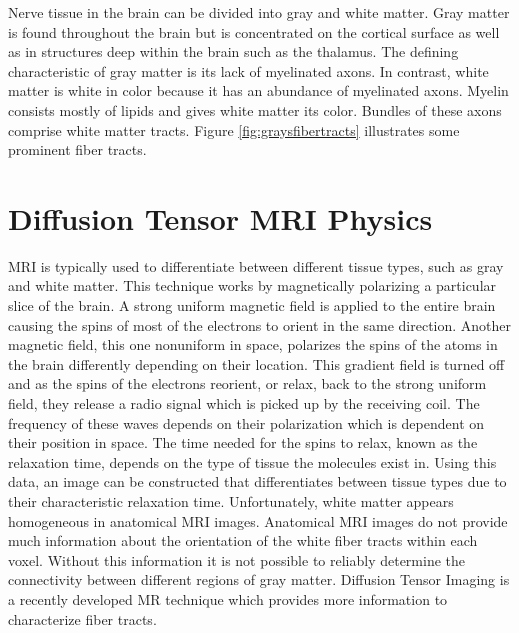 Nerve tissue in the brain can be divided into gray and white matter.  Gray matter is found throughout the brain but is concentrated on the cortical surface as well as in structures deep within the brain such as the thalamus.  The defining characteristic of gray matter is its lack of myelinated axons.  In contrast, white matter is white in color because it has an abundance of myelinated axons.  Myelin consists mostly of lipids and gives white matter its color.  Bundles of these axons comprise white matter tracts. Figure \ref{fig:graysfibertracts} illustrates some prominent fiber tracts.

\section{Diffusion Tensor MRI Physics}

MRI is typically used to differentiate between different tissue types, such as gray and white matter.  This technique works by magnetically polarizing a particular slice of the brain.  A strong uniform magnetic field is applied to the entire brain causing the spins of most of the electrons to orient in the same direction.  Another magnetic field, this one nonuniform in space, polarizes the spins of the atoms in the brain differently depending on their location.  This gradient field is turned off and as the spins of the electrons reorient, or relax, back to the strong uniform field, they release a radio signal which is picked up by the receiving coil.  The frequency of these waves depends on their polarization which is dependent on their position in space.  The time needed for the spins to relax, known as the relaxation time, depends on the type of tissue the molecules exist in.  Using this data, an image can be constructed that differentiates between tissue types due to their characteristic relaxation time. Unfortunately, white matter appears homogeneous in anatomical MRI images.  Anatomical MRI images do not provide much information about the orientation of the white fiber tracts within each voxel.  Without this information it is not possible to reliably determine the connectivity between different regions of gray matter.  Diffusion Tensor Imaging is a recently developed MR technique which provides more information to characterize fiber tracts.

